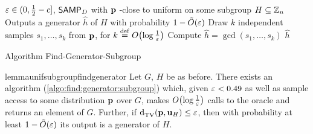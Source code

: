 \begin{algorithm}
  \begin{algorithmic}
    \Require $\varepsilon\in(0,\frac{1}{2}-c]$, ${\sf SAMP}_D$ with $\mathbf{p}$ \eps-close to uniform on some subgroup $H\subseteq\mathbb{Z}_n$
    \Ensure Outputs a generator $\hat{h}$ of $H$ with probability $1-\tildeO{\eps}$
    \State Draw $k$ independent samples $s_1,\dots,s_k$ from $\mathbf{p}$, for $k\eqdef\bigO{\log\frac{1}{\eps}}$
    \State Compute $\hat{h}=\gcd(s_1,\dots,s_k)$
    \State \Return $\hat{h}$
  \end{algorithmic}\caption{\label{algo:find:generator:subgroup} Algorithm {\sc Find-Generator-Subgroup}}
\end{algorithm}

\begin{restatable}{lemma}{unifsubgroupfindgenerator}\label{lemma:find:generator:subgroup}
  Let $G$, $H$ be as before. There exists an algorithm (\cref{algo:find:generator:subgroup}) which, given $\varepsilon < 0.49$ as well as sample access to some distribution $\mathbf{p}$ over $G$, makes $\bigO{\log\frac{1}{\eps}}$ calls to the oracle and returns an element of $G$. Further, if ${\operatorname{d}_{\textrm{TV}}^{}\!\left({\mathbf{p}, \mathbf{u}_H}\right)} \leq \varepsilon$, then with probability at least $1-\tildeO{\eps}$ its output is a generator of $H$.
\end{restatable}
